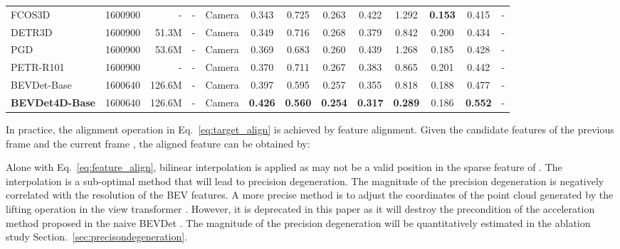 \documentclass[10pt,twocolumn,letterpaper]{article}
\begin{document}
\begin{table*}[t]
{\begin{tabular}{l|crrc|cccccc|c|r}
    \hline
    FCOS3D \cite{FCOS3D}&1600900  &-          &-          & Camera   & 0.343         & 0.725             & 0.263              & 0.422             & 1.292             & \textbf{0.153}    & 0.415           &-\\
    DETR3D \cite{DETR3D}  &1600900    &51.3M      &-          & Camera   & 0.349         & 0.716             & 0.268              & 0.379             & 0.842             & 0.200             & 0.434           &-\\
    PGD \cite{PGD}      &1600900    &53.6M      &-          & Camera   & 0.369         & 0.683             & 0.260              & 0.439             & 1.268             & 0.185             & 0.428           &-\\
    PETR-R101 \cite{PETR}&1600900     &-         &-           & Camera   & 0.370         & 0.711             & 0.267              & 0.383             & 0.865             & 0.201             & 0.442           &-\\
    BEVDet-Base\cite{BEVDet}&1600640    &126.6M     &-          & Camera   & 0.397         & 0.595             & 0.257              & 0.355             & 0.818             & 0.188             & 0.477           &-\\
    \textbf{BEVDet4D-Base} &1600640    &126.6M     &-           & Camera   & \textbf{0.426}& \textbf{0.560}    & \textbf{0.254}     & \textbf{0.317}    & \textbf{0.289}    & 0.186             & \textbf{0.552}  &-\\
    \hline

    \hline
    \end{tabular}}
  \label{tab:nus-val}\end{table*}


In practice, the alignment operation in Eq.~\ref{eq:target_align} is achieved by feature alignment. Given the candidate features of the previous frame  and the current frame , the aligned feature can be obtained by:

Alone with Eq.~\ref{eq:feature_align}, bilinear interpolation is applied as  may not be a valid position in the sparse feature of . The interpolation is a sub-optimal method that will lead to precision degeneration. The magnitude of the precision degeneration is negatively correlated with the resolution of the BEV features. A more precise method is to adjust the coordinates of the point cloud generated by the lifting operation in the view transformer \cite{LSS}. However, it is deprecated in this paper as it will destroy the precondition of the acceleration method proposed in the naive BEVDet \cite{BEVDet}.  The magnitude of the precision degeneration will be quantitatively estimated in the ablation study Section.~\ref{sec:precisondegeneration}.
\end{document}

